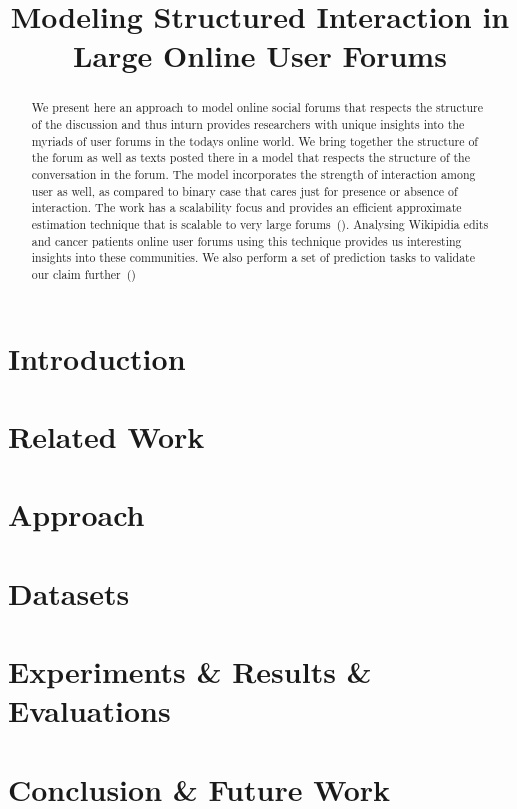 \documentclass{article}
\title{Modeling Structured Interaction in \\ Large Online User Forums }
\newcommand{\comment}[1]{{\color{red}{#1}}}
\begin{document}
\maketitle
\begin{abstract}
We present here an approach to model online social forums that respects the
structure of the discussion and thus inturn provides researchers with unique
insights into the myriads of user forums in the todays online world. We
bring together the structure of the forum as well as texts posted there
in a model that respects the structure of the conversation in the forum. The
model incorporates the strength of interaction among user as well, as compared
to binary case that cares just for presence or absence of interaction. The
work has a scalability focus and provides an efficient approximate estimation 
technique that is scalable
to very large forums~(\comment{I am thinking of using stochastic variational for
scalability if time permits.}).
Analysing Wikipidia edits and cancer patients online user forums using this 
technique provides us interesting insights into these communities.
We also perform a set of prediction tasks to validate our claim
further~(\comment{We need to decide this soon, though it hinges on once the
final model is coded and we have analysed the data using it})
\end{abstract}

\section{Introduction}


\section{Related Work}


\section{Approach}


\section{Datasets}

% 
% 
% 
\section{Experiments \& Results \& Evaluations}


\section{Conclusion \& Future Work}



%

%
%


\end{document}
